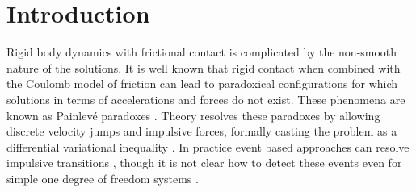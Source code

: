 %
%
%

\section{Introduction}
\label{sec:introduction}


Rigid body dynamics with frictional contact is complicated by the non-smooth
nature of the solutions. It is well known \cite{bib:baraff1993issues} that rigid
contact when combined with the Coulomb model of friction can lead to paradoxical
configurations for which solutions in terms of accelerations and forces do not
exist. These phenomena are known as Painlev\'e paradoxes
\cite{bib:hogan2017regularization}. Theory resolves these paradoxes by allowing
discrete velocity jumps and impulsive forces, formally casting the problem as a
differential variational inequality \cite{bib:pang2008differential}. In practice
event based approaches can resolve impulsive transitions \cite{bib:haug1986},
though it is not clear how to detect these events even for simple one degree of
freedom systems \cite{bib:hogan2017regularization}.

